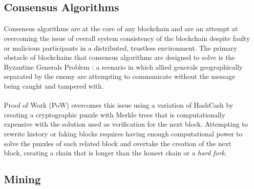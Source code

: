\subsection{Consensus Algorithms}


\paragraph{} Consensus algorithms are at the core of any blockchain and are an attempt at overcoming the issue of overall system consistency of the blockchain despite faulty or malicious participants in a distributed, trustless environment. The primary obstacle of blockchains that consensus algorithms are designed to solve is the Byzantine Generals Problem \cite{lamportshostakpease1982}: a scenario in which allied generals geographically separated by the enemy are attempting to communicate without the message being caught and tampered with.

\paragraph{} Proof of Work (PoW) overcomes this issue using a variation of HashCash \cite{back2002} by creating a cryptographic puzzle with Merkle trees that is computationally expensive with the solution used as verification for the next block. Attempting to rewrite history or faking blocks requires having enough computational power to solve the puzzles of each related block and overtake the creation of the next block, creating a chain that is longer than the honest chain or a \textit{hard fork}.


\subsection{Mining} \label{section:mining}

